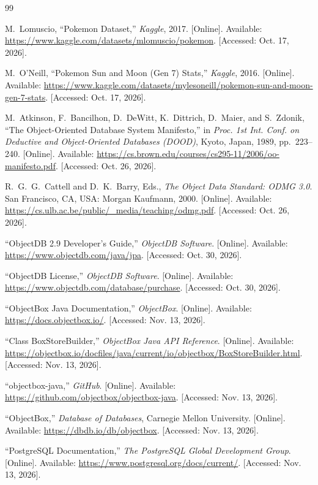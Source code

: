\documentclass{article}
\begin{document}
\begin{thebibliography}{99}

    M.~Lomuscio, ``Pokemon Dataset,'' \emph{Kaggle}, 2017. [Online]. Available: \url{https://www.kaggle.com/datasets/mlomuscio/pokemon}. [Accessed: Oct. 17, 2026].

    M.~O'Neill, ``Pokemon Sun and Moon (Gen 7) Stats,'' \emph{Kaggle}, 2016. [Online]. Available: \url{https://www.kaggle.com/datasets/mylesoneill/pokemon-sun-and-moon-gen-7-stats}. [Accessed: Oct. 17, 2026].

    M.~Atkinson, F.~Bancilhon, D.~DeWitt, K.~Dittrich, D.~Maier, and S.~Zdonik, ``The Object-Oriented Database System Manifesto,'' in \emph{Proc. 1st Int. Conf. on Deductive and Object-Oriented Databases (DOOD)}, Kyoto, Japan, 1989, pp.~223--240. [Online]. Available: \url{https://cs.brown.edu/courses/cs295-11/2006/oo-manifesto.pdf}. [Accessed: Oct. 26, 2026].

    R.~G.~G.~Cattell and D.~K.~Barry, Eds., \emph{The Object Data Standard: ODMG 3.0}. San Francisco, CA, USA: Morgan Kaufmann, 2000. [Online]. Available: \url{https://cs.ulb.ac.be/public/_media/teaching/odmg.pdf}. [Accessed: Oct. 26, 2026].

    ``ObjectDB 2.9 Developer's Guide,'' \emph{ObjectDB Software}. [Online]. Available: \url{https://www.objectdb.com/java/jpa}. [Accessed: Oct. 30, 2026].

    ``ObjectDB License,'' \emph{ObjectDB Software}. [Online]. Available: \url{https://www.objectdb.com/database/purchase}. [Accessed: Oct. 30, 2026].

    ``ObjectBox Java Documentation,'' \emph{ObjectBox}. [Online]. Available: \url{https://docs.objectbox.io/}. [Accessed: Nov. 13, 2026].

    ``Class BoxStoreBuilder,'' \emph{ObjectBox Java API Reference}. [Online]. Available: \url{https://objectbox.io/docfiles/java/current/io/objectbox/BoxStoreBuilder.html}. [Accessed: Nov. 13, 2026].

    ``objectbox-java,'' \emph{GitHub}. [Online]. Available: \url{https://github.com/objectbox/objectbox-java}. [Accessed: Nov. 13, 2026].

    ``ObjectBox,'' \emph{Database of Databases}, Carnegie Mellon University. [Online]. Available: \url{https://dbdb.io/db/objectbox}. [Accessed: Nov. 13, 2026].

    ``PostgreSQL Documentation,'' \emph{The PostgreSQL Global Development Group}. [Online]. Available: \url{https://www.postgresql.org/docs/current/}. [Accessed: Nov. 13, 2026].

\end{thebibliography}
\end{document}
